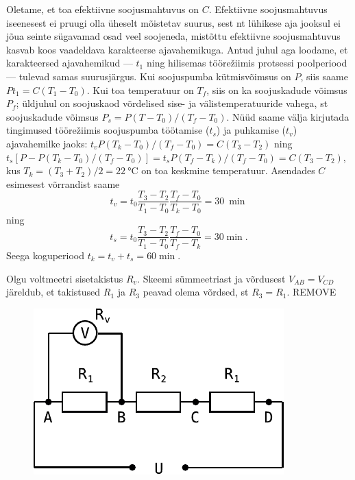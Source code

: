\documentclass[10pt]{article}
\newcommand{\p}[1]{REMOVE}
\begin{document}
\solu
Oletame, et toa efektiivne soojusmahtuvus on $C$. Efektiivne soojusmahtuvus iseenesest ei pruugi olla üheselt mõistetav suurus, sest nt lühikese aja jooksul ei jõua seinte sügavamad osad veel soojeneda, mistõttu efektiivne soojusmahtuvus kasvab koos vaadeldava karakteerse ajavahemikuga. Antud juhul aga loodame, et karakteersed ajavahemikud --- $t_1$ ning hilisemas töörežiimis protsessi poolperiood --- tulevad samas suurusjärgus. Kui soojuspumba kütmisvõimsus on $P$, siis saame $Pt_1=C(T_1-T_0)$. Kui toa temperatuur on $T_f$, siis on ka soojuskadude võimsus $P_f$; üldjuhul on soojuskaod võrdelised sise- ja välistemperatuuride vahega, st soojuskadude võimsus $P_s=P(T-T_0)/(T_f-T_0)$. Nüüd saame välja kirjutada tingimused töörežiimis soojuspumba töötamise ($t_s$) ja puhkamise ($t_v$) ajavahemilke jaoks: $t_vP(T_k-T_0)/(T_f-T_0)=C(T_3-T_2)$ ning $t_s[P-P(T_k-T_0)/(T_f-T_0)]=t_sP(T_f-T_k)/(T_f-T_0)=C(T_3-T_2)$, kus $T_k=(T_3+T_2)/2=\SI{22}\celsius$ on toa keskmine temperatuur. Asendades $C$ esimesest võrrandist saame $$t_v=t_0\frac{T_3-T_2}{T_1-T_0}\frac{T_f-T_0}{T_k-T_0}=\SI{30}{\min}$$ ning $$t_s=t_0\frac{T_3-T_2}{T_1-T_0}\frac{T_f-T_0}{T_f-T_k}=\SI{30}\min.$$ Seega koguperiood $t_k=t_v+t_s=\SI{60}\min$.
\probend
\bigskip


\solu
Olgu voltmeetri sisetakistus $R_v$. Skeemi sümmeetriast ja võrdusest $V_{AB}=V_{CD}$ järeldub, et takistused $R_1$ ja $R_3$ peavad olema võrdsed, st $R_3=R_1$. \p{1}

\begin{figure}
\vspace{-1em}
  \begin{center}
    \includegraphics[width=1\linewidth]{2023-v2g-07-yl1.pdf}
  \end{center}
\end{figure}
\end{document}
